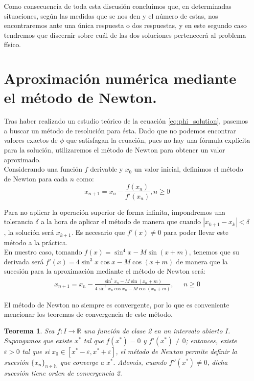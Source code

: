 \documentclass[11pt]{book}
\newtheorem{theorem}{Teorema}
\newcommand\ddfrac[2]{\frac{\displaystyle #1}{\displaystyle #2}}
\begin{document}
Como consecuencia de toda esta discusión concluimos que, en determinadas situaciones, según las medidas que se nos den y el número de estas, nos encontraremos ante una única respuesta o dos respuestas, y en este segundo caso tendremos que discernir sobre cuál de las dos soluciones pertenecerá al problema físico.\\


\section{Aproximación numérica mediante el método de Newton.}
\label{sec:newton_rhapson}
Tras haber realizado un estudio teórico de la ecuación \eqref{eq:phi_solution}, pasemos a buscar un método de resolución para ésta. Dado que no podemos encontrar valores exactos de $\phi$ que satisfagan la ecuación, pues no hay una fórmula explícita para la solución, utilizaremos el método de Newton para obtener un valor aproximado.\\

Considerando una función $f$ derivable y $x_0$ un valor inicial, definimos el método de Newton para cada $n$ como:
\[
x_{n+1}=x_n-\ddfrac{f(x_n)}{f'(x_n)}, n\geq0
\]

Para no aplicar la operación superior de forma infinita, impondremos una tolerancia $\delta$ a la hora de aplicar el método de manera que cuando $|x_{k+1}-x_k|<\delta$, la solución será $x_{k+1}$. Es necesario que $f'(x)\neq0$ para poder llevar este método a la práctica.\\

En nuestro caso, tomando $f(x)=\sin^4{x}-M\sin{(x+m)}$, tenemos que su derivada será $f'(x)=4\sin^3{x}\cos{x}-M\cos{(x+m)}$ de manera que la sucesión para la aproximación mediante el método de Newton será:
\begin{align}
x_{n+1}=x_n-\ddfrac{\sin^4{x_n}-M\sin{(x_n+m)}}{4\sin^3{x_n}\cos{x_n}-M\cos{(x_n+m)}}, \; \; \; \; \; n\geq0
\label{eq:phi_newton}
\end{align}

El método de Newton no siempre es convergente, por lo que es conveniente mencionar los teoremas de convergencia de este método. 
\begin{theorem}
\label{theo:convergence_newton}
Sea $f:I\rightarrow\mathbb{R}$ una función de clase 2 en un intervalo abierto $I$. Supongamos que existe $x^*$ tal que $f(x^*)=0$ y $f'(x^*)\neq0$; entonces, existe $\varepsilon>0$ tal que si $x_0\in[x^*-\varepsilon,x^*+\varepsilon]$, el método de Newton permite definir la sucesión $\{x_n\}_{n\in\mathbb{N}}$ que converge a $x^*$. Además, cuando $f''(x^*)\neq0$, dicha sucesión tiene orden de convergencia 2.\\
\end{theorem}
\end{document}
